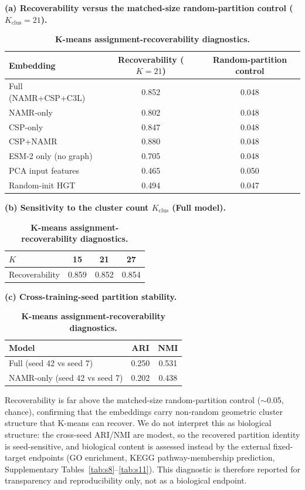 \documentclass[11pt,a4paper]{article}
\newcommand{\supptabrange}[2]{Supplementary Tables~\ref{#1}--\ref{#2}}
\begin{document}
\begin{table}[h]
\centering
\caption{\textbf{K-means assignment-recoverability diagnostics.}}
\label{tab:s17}
\footnotesize
\textbf{(a) Recoverability versus the matched-size random-partition control ($K_{\text{clus}}=21$).}
\begin{tabular}{@{}lcc@{}}
\toprule
\textbf{Embedding} & \textbf{Recoverability ($K=21$)} & \textbf{Random-partition control} \\
\midrule
Full (NAMR+CSP+C3L) & 0.852 & 0.048 \\
NAMR-only & 0.802 & 0.048 \\
CSP-only & 0.847 & 0.048 \\
CSP+NAMR & 0.880 & 0.048 \\
ESM-2 only (no graph) & 0.705 & 0.048 \\
PCA input features & 0.465 & 0.050 \\
Random-init HGT & 0.494 & 0.047 \\
\bottomrule
\end{tabular}

\textbf{(b) Sensitivity to the cluster count $K_{\text{clus}}$ (Full model).}
\begin{tabular}{@{}lccc@{}}
\toprule
$K$ & 15 & 21 & 27 \\
\midrule
Recoverability & 0.859 & 0.852 & 0.854 \\
\bottomrule
\end{tabular}

\textbf{(c) Cross-training-seed partition stability.}
\begin{tabular}{@{}lcc@{}}
\toprule
\textbf{Model} & \textbf{ARI} & \textbf{NMI} \\
\midrule
Full (seed 42 vs seed 7) & 0.250 & 0.531 \\
NAMR-only (seed 42 vs seed 7) & 0.202 & 0.438 \\
\bottomrule
\end{tabular}

\noindent Recoverability is far above the matched-size random-partition control
($\sim$0.05, chance), confirming that the embeddings carry non-random geometric
cluster structure that K-means can recover. We do not interpret this as biological
structure: the cross-seed ARI/NMI are modest, so the recovered partition identity
is seed-sensitive, and biological content is assessed instead by the external
fixed-target endpoints (GO enrichment, KEGG pathway-membership prediction,
\supptabrange{tab:s8}{tab:s11}). This diagnostic is therefore reported for
transparency and reproducibility only, not as a biological endpoint.


\FloatBarrier
\end{table}
\end{document}
